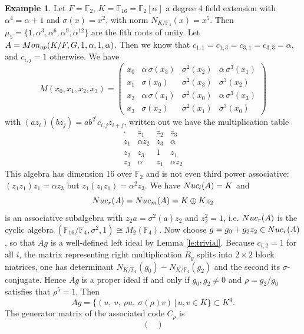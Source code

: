 \documentclass[11pt]{amsart}
\theoremstyle{plain}
\theoremstyle{definition}
\newtheorem{example}[theorem]{Example}
\begin{document}
\begin{example}\label{ex:one}
Let $F=\mathbb F_2$, $ K=\mathbb F_{16}=\mathbb F_2[\alpha]$ a degree 4 field extension with $\alpha^{4}=\alpha+1$ and
  $\sigma(x)=x^{2}$, with norm  $N_{K/\mathbb F_4}(x)=x^{5}$. Then $\mu_5=\{1,\alpha^{3},\alpha^{6},\alpha^{9},\alpha^{12}\}$ are the fith roots of unity. Let $A={\rm Mon}_{op}(K/F,G,1, \alpha, 1,\alpha)$.
 Then we know that
 $ c_{1,1}=c_{1,3}=c_{3,1}=c_{3,3}=\alpha,$ and $ c_{i,j}=1$ otherwise.
We have
\[
  M(x_0,x_1,x_2,x_3)=
  \left(
 \begin{array}{cccc}
    x_0 & \alpha\,\sigma(x_3) & \sigma^{2}(x_2) & \alpha\,\sigma^{3}(x_1)\\
    x_1 & \sigma(x_0)         & \sigma^{2}(x_3) & \sigma^{3}(x_2)\\[2pt]
    x_2 & \alpha\,\sigma(x_1) & \sigma^{2}(x_0) & \alpha\,\sigma^{3}(x_3)\\
    x_3 & \sigma(x_2)         & \sigma^{2}(x_1) & \sigma^{3}(x_0)
  \end{array}
 \right)
\]
with
$(az_i)(bz_j)=ab^{2^{i}}c_{i,j}z_{i+j}$, written out we have the multiplication table
\[
  \renewcommand{\arraystretch}{1.25}
  \begin{array}{c|ccc}
    \cdot & z_1 & z_2 & z_3\\\hline
    z_1 & \alpha z_2 & z_3 & \alpha\\
    z_2 & z_3 & 1 & z_1\\
    z_3 & \alpha & z_1 & \alpha z_2
  \end{array}
\]
This algebra has dimension 16 over $\mathbb F_2$ and is not even third power associative:
$(z_1z_1)z_1=\alpha z_3$ but $z_1(z_1z_1)=\alpha^{2}z_3$.
We have $ {\rm Nuc}_l(A)=K$ and
$${\rm Nuc}_r(A)= {\rm Nuc}_m(A)=K\oplus Kz_2$$
 is an associative subalgebra with $z_2a=\sigma^{2}(a)z_2$ and
$z_2^{2}=1$, i.e. ${\rm Nuc}_r(A)$ is the cyclic algebra $(\mathbb F_{16}/\mathbb F_4,\sigma^{2},1)\cong M_2(\mathbb F_4)$. Now choose
$g=g_0+g_2z_2\in {\rm Nuc}_r(A)$,
so that $Ag$ is a well-defined left ideal by Lemma \ref{le:trivial}. Because $c_{i,2}=1$ for all $i$, the matrix representing right
multiplication $R_g$ splits into  $2\times 2$  block matrices,  one has determinant $N_{K/\mathbb F_4}(g_0)-N_{K/\mathbb F_4}(g_2)$ and the second its $\sigma$-conjugate. Hence
$Ag$ is a proper  ideal if and only if
$g_0,g_2\neq 0$ and $\rho=g_2/g_0 $ satisfies that $\rho^{5}=1.$
Then
 $$ Ag=\{(u,\ v,\ \rho u,\ \sigma(\rho)v)\,|\, u,v\in K\}\subset K^{4}.
$$
The generator matrix of the associated code $C_\rho$ is
\[
\begin{pmatrix}

\end{pmatrix}\]
\end{example}
\end{document}
